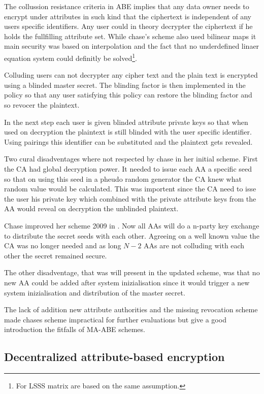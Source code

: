 The collussion resistance criteria in ABE implies that any data owner needs to encrypt under attributes in such kind that the ciphertext is independent of any users specific identifiers. Any user could in theory decrypter the ciphertext if he holds the fullfilling attribute set. While chase's scheme also used bilinear maps it main security was based on interpolation and the fact that no underdefined linaer equation system could definitly be solved\footnote{For LSSS matrix are based on the same assumption.}.  

Colluding users can not decrypter any cipher text and the plain text is encrypted using a blinded master secret. The blinding factor is then implemented in the policy so that any user satisfying this policy can restore the blinding factor and so revocer the plaintext. 

In the next step each user is given blinded attribute private keys so that when used on decryption the plaintext is still blinded with the user specific identifier. Using pairings this identifier can be substituted and the plaintext gets revealed. 

Two cural disadventages where not respected by chase in her initial scheme. First the CA had global decryption power. It needed to issue each AA a specific seed so that on using this seed in a pheudo random generator the CA knew what random value would be calculated. This was importent since the CA need to isse the user his private key which combined with the private attribute keys from the AA would reveal on decryption the unblinded plaintext. 

Chase improved her scheme 2009 in \cite{chase2009improving}. Now all AAs will do a n-party key exchange to distribute the secret seeds with each other. Agreeing on a well known value the CA was no longer needed and as long $N-2$ AAs are not colluding with each other the secret remained secure. 

The other disadventage, that was will present in the updated scheme, was that no new AA could be added after system inizialisation since it would trigger a new system inizialisation and distribution of the master secret. 

The lack of addition new attribute authorities and the missing revocation scheme made chases scheme impractical for further evaluations but give a good introduction the fitfalls of MA-ABE schemes.

\subsection{Decentralized attribute-based encryption}

